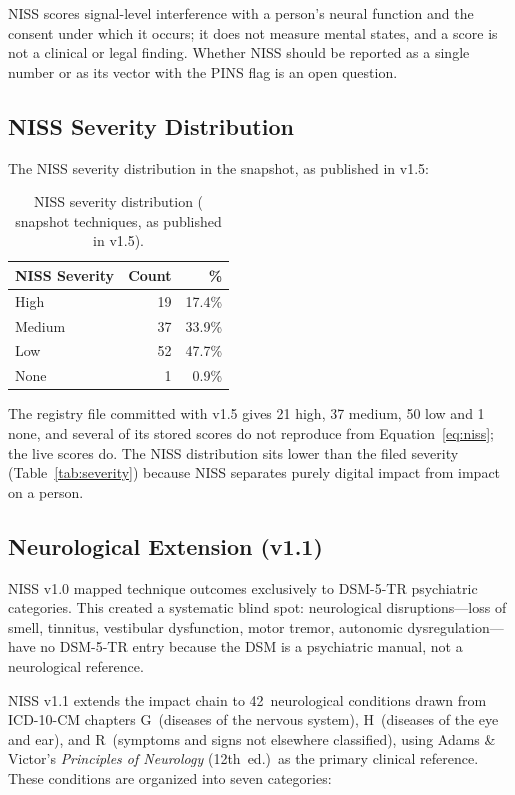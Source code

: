 \noindent NISS scores signal-level interference with a person's neural function and the
consent under which it occurs; it does not measure mental states, and a score is not a
clinical or legal finding. Whether NISS should be reported as a single number or as its
vector with the PINS flag is an open question.

\subsection{NISS Severity Distribution}

The NISS severity distribution in the snapshot, as published in v1.5:

\begin{table}[H]
\centering
\caption{NISS severity distribution (\SnapshotTechniques{} snapshot techniques, as published in v1.5).}
\label{tab:niss-severity}
\small
\begin{tabular}{@{}l r r@{}}
\toprule
\textbf{NISS Severity} & \textbf{Count} & \textbf{\%} \\
\midrule
High     & 19 & 17.4\% \\
Medium   & 37 & 33.9\% \\
Low      & 52 & 47.7\% \\
None     &  1 &  0.9\% \\
\bottomrule
\end{tabular}
\end{table}

The registry file committed with v1.5 gives 21 high, 37 medium, 50 low and 1 none, and
several of its stored scores do not reproduce from Equation~\ref{eq:niss}; the live scores
do. The NISS distribution sits lower than the filed severity (Table~\ref{tab:severity})
because NISS separates purely digital impact from impact on a person.


\subsection{Neurological Extension (v1.1)}

NISS v1.0 mapped technique outcomes exclusively to DSM-5-TR psychiatric
categories. This created a systematic blind spot: neurological disruptions---loss
of smell, tinnitus, vestibular dysfunction, motor tremor, autonomic
dysregulation---have no DSM-5-TR entry because the DSM is a psychiatric manual,
not a neurological reference.

NISS v1.1 extends the impact chain to 42~neurological conditions drawn from
ICD-10-CM chapters G~(diseases of the nervous system), H~(diseases of the eye
and ear), and R~(symptoms and signs not elsewhere classified), using Adams \&
Victor's \textit{Principles of Neurology} (12th~ed.)~as the primary clinical
reference. These conditions are organized into seven categories:

